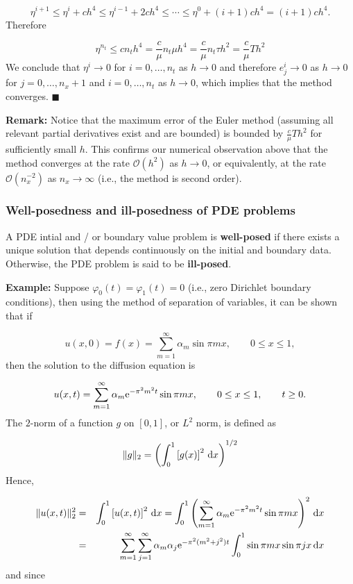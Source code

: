 \documentclass[12pt,landscape]{article}
\begin{document}
{\[
\eta^{i+1} \leq \eta^i  + ch^4 \leq \eta^{i-1} + 2ch^4 \leq \cdots \leq \eta^{0} + (i+1)ch^4 = (i+1)ch^4.
\]
Therefore

\[
\eta^{n_t} \leq c n_th^4 = \frac{c}{\mu} n_t\mu h^4 = \frac{c}{\mu} n_t\tau h^2 = \frac{c}{\mu}T h^2 
\]
We conclude that $\eta^i \to 0$ for $i = 0, \ldots, n_t$ as $h \to 0$ and therefore $e^i_j \to 0$ as $h \to 0$ for $j = 0, \ldots, n_x + 1$ and $i = 0, \ldots, n_t$ as $h \to 0$, which implies that the method converges.   $\blacksquare$

\textbf{Remark:} Notice that the maximum error of the Euler method (assuming all relevant partial derivatives exist and are bounded) is bounded by $\frac{c}{\mu}T h^2$ for sufficiently small $h$. This confirms our numerical observation above that the method converges at the rate $\mathcal{O}(h^2)$ as $h \to 0$, or equivalently, at the rate $\mathcal{O}(n_x^{-2})$ as $n_x \to \infty$ (i.e., the method is second order).

\subsubsection{Well-posedness and ill-posedness of PDE problems}
A PDE intial and / or boundary value problem is \textbf{well-posed} if there exists a unique solution that depends continuously on the initial and boundary data.  Otherwise, the PDE problem is said to be \textbf{ill-posed}.

\textbf{Example:}  Suppose $\varphi_0(t) = \varphi_1(t) = 0$ (i.e., zero Dirichlet boundary conditions), then using the method of separation of variables, it can be shown that if

\[
u(x,0) = f(x) = \sum_{m = 1}^{\infty}\alpha_m \sin \pi m x, \qquad 0 \leq x \leq 1,
\]
then the solution to the diffusion equation is

\[
u(x,t) = \sum_{m = 1}^{\infty}\alpha_m {\rm e}^{-\pi^2m^2 t} \sin \pi m x, \qquad 0 \leq x \leq 1, \qquad t \geq 0.
\]
The $2$-norm of a function $g$ on $[0, 1]$, or $L^2$ norm, is defined as

\[
\| g \|_2 = \left( \int_0^1 \left[g(x)\right]^2\,{\rm d}x   \right)^{1/2}
\]
Hence,


\begin{eqnarray*}
\|u(x,t)\|_2^2 &=& \int_0^1 \left[u(x,t)\right]^2\,{\rm d}x  = \int_0^1 \left(\sum_{m = 1}^{\infty}\alpha_m {\rm e}^{-\pi^2m^2 t} \sin \pi m x  \right)^2\,{\rm d}x \\
&=& \sum_{m=1}^{\infty}\sum_{j=1}^{\infty} \alpha_m \alpha_j{\rm e}^{-\pi^2(m^2 + j^2) t}\int_0^1 \sin\pi m x\sin \pi j x\, {\rm d}x
\end{eqnarray*}
and since

}
\end{document}
